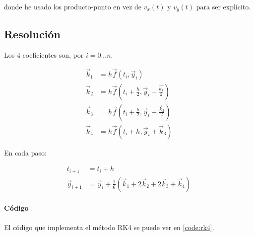 donde he usado los producto-punto en vez de $v_x(t)$ y $v_y(t)$ para ser explícito.

\newpage 

\subsection{Resolución}

Los 4 coeficientes son, por $i = 0 ... n$.

\begin{align*}
	\vec{k}_1 &=
h\vec{f}(t_i, \vec{y}_i) \\
	\vec{k}_2 &=
h\vec{f}(
	t_i + \frac{h}{2}, 
	\vec{y}_i + \frac{\vec{k_1}}{2}
) \\
	\vec{k}_3 &=
h\vec{f}(
	t_i + \frac{h}{2}, 
	\vec{y}_i + \frac{\vec{k}_2}{2}
) \\
	\vec{k}_4 &= 
h\vec{f}(
	t_i + h,
	\vec{y}_i + \vec{k}_3
)
\end{align*}

En cada paso: 

\begin{align*}
	t_{i+1} &= t_i + h \\
	\vec{y}_{i+1} &=
\vec{y}_i + \frac{1}{6}(
	\vec{k}_1 +
	2\vec{k}_2 +
	2\vec{k}_3 +
	\vec{k}_4
)
\end{align*}

\paragraph{Código} El código que implementa el método RK4 se puede ver en \ref{code:rk4}.